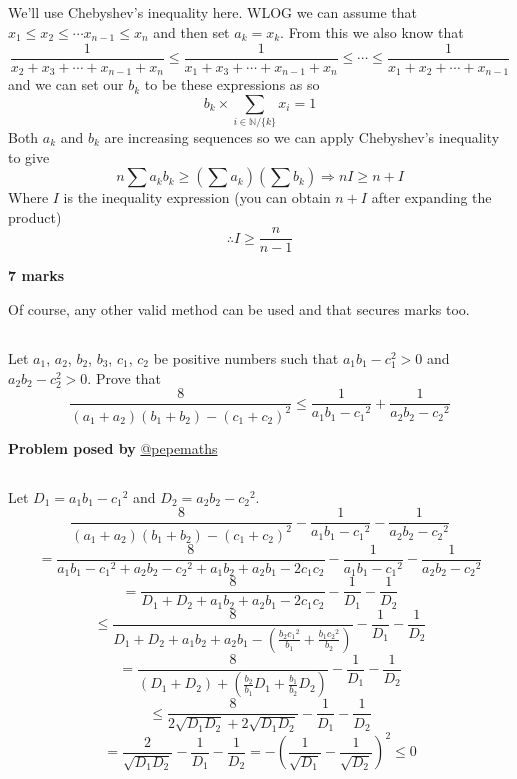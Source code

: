\documentclass[12pt]{article}
\begin{document}
\subsection*{}
We'll use Chebyshev's inequality here. WLOG we can assume that $x_1\leq x_2\leq \cdots x_{n-1} \leq x_n$ and then set $a_k = x_k$. From this we also know that 
$$ \frac{1}{x_2+x_3+\cdots+x_{n-1}+x_n} \leq \frac{1}{x_1+x_3+\cdots+x_{n-1}+x_n} \leq \cdots \leq \frac{1}{x_1+x_2+\cdots+x_{n-1}}   $$
and we can set our $b_k$ to be these expressions as so $$b_k  \times \sum_{i \in \mathbb{N} / \{k\} } x_i = 1$$
Both $a_k$ and $b_k$ are increasing sequences so we can apply Chebyshev's inequality to give
$$ n\sum a_kb_k \geq \left( \sum a_k \right) \left(\sum b_k  \right) \Rightarrow n I \geq n + I $$
Where $I$ is the inequality expression (you can obtain $n+I$ after expanding the product)
$$ \therefore I \geq \frac{n}{n-1}$$
\begin{flushright}
\textbf{7 marks}
\end{flushright}

Of course, any other valid method can be used and that secures marks too.  
 \subsection*{}
 Let $a_1$, $a_2$, $b_2$, $b_3$, $c_1$, $c_2$ be positive numbers such that $a_1 b_1 - c_1 ^2 >0$ and  $a_2 b_2 - c_2 ^2 >0$. Prove that $$\frac{8}{(a_1+a_2)(b_1+b_2)-{(c_1+c_2)}^2}\le\frac{1}{a_1b_1-{c_1}^2}+\frac{1}{a_2b_2-{c_2}^2}$$
 
 \begin{flushright}
\textbf{Problem posed by}
\textcolor{RoyalBlue2}{\href{https://www.instagram.com/pepemaths/}{@pepemaths}}
\end{flushright}

 
 
 
 
 
 \subsection*{}

Let $D_1=a_1b_1-{c_1}^2$ and $D_2=a_2b_2-{c_2}^2$.
$$\frac{8}{(a_1+a_2)(b_1+b_2)-{(c_1+c_2)}^2}-\frac{1}{a_1b_1-{c_1}^2}-\frac{1}{a_2b_2-{c_2}^2}$$
$$=\frac{8}{a_1b_1-{c_1}^2+a_2b_2-{c_2}^2+a_1b_2+a_2b_1-2c_1c_2}-\frac{1}{a_1b_1-{c_1}^2}-\frac{1}{a_2b_2-{c_2}^2}$$
$$=\frac{8}{D_1+D_2+a_1b_2+a_2b_1-2c_1c_2}-\frac{1}{D_1}-\frac{1}{D_2}$$
$$\le\frac{8}{D_1+D_2+a_1b_2+a_2b_1-(\frac{b_2{c_1}^2}{b_1}+\frac{b_1{c_2}^2}{b_2})}-\frac{1}{D_1}-\frac{1}{D_2}$$
$$=\frac{8}{(D_1+D_2)+(\frac{b_2}{b_1}D_1+\frac{b_1}{b_2}D_2)}-\frac{1}{D_1}-\frac{1}{D_2}$$
$$\le\frac{8}{2\sqrt{D_1D_2}+2\sqrt{D_1D_2}}-\frac{1}{D_1}-\frac{1}{D_2}$$
$$=\frac{2}{\sqrt{D_1D_2}}-\frac{1}{D_1}-\frac{1}{D_2}=-{(\frac{1}{\sqrt{D_1}}-\frac{1}{\sqrt{D_2}})}^2\le0$$
\end{document}

